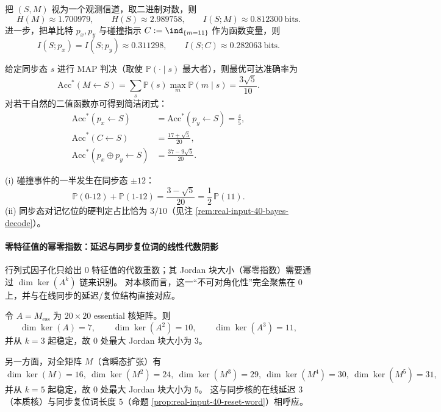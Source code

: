 \begin{remark}\label{rem:real-input-40-mutual-info}
把 $(S,M)$ 视为一个观测信道，取二进制对数，则
\[
H(M)\approx 1.700979,\qquad
H(S)\approx 2.989758,\qquad
I(S;M)\approx 0.812300\ \text{bits}.
\]
进一步，把单比特 $p_x,p_y$ 与碰撞指示 $C:=\ind_{\{m=11\}}$ 作为函数变量，则
\[
I(S;p_x)=I(S;p_y)\approx 0.311298,\qquad
I(S;C)\approx 0.282063\ \text{bits}.
\]
\end{remark}

\begin{proposition}\label{prop:real-input-40-map-accuracies}
给定同步态 $s$ 进行 MAP 判决（取使 $\mathbb{P}(\cdot\mid s)$ 最大者），则最优可达准确率为
\[
\mathrm{Acc}^*(M\leftarrow S)=\sum_s \mathbb{P}(s)\max_m \mathbb{P}(m\mid s)=\frac{3\sqrt5}{10}.
\]
对若干自然的二值函数亦可得到简洁闭式：
\[
\begin{aligned}
\mathrm{Acc}^*(p_x\leftarrow S)&=\mathrm{Acc}^*(p_y\leftarrow S)=\frac45,\\
\mathrm{Acc}^*(C\leftarrow S)&=\frac{17+\sqrt5}{20},\\
\mathrm{Acc}^*(p_x\oplus p_y\leftarrow S)&=\frac{37-9\sqrt5}{20}.
\end{aligned}
\]
\end{proposition}

\begin{remark}\label{rem:real-input-40-two-dyn-inferences}
(i) 碰撞事件的一半发生在同步态 $\pm12$：
\[
\mathbb{P}(0\text{-}12)+\mathbb{P}(1\text{-}12)=\frac{3-\sqrt5}{20}=\frac12\,\mathbb{P}(11).
\]
(ii) 同步态对记忆位的硬判定占比恰为 $3/10$（见注 \ref{rem:real-input-40-bayes-decode}）。
\end{remark}

\paragraph{零特征值的幂零指数：延迟与同步复位词的线性代数阴影}
行列式因子化只给出 $0$ 特征值的代数重数；其 Jordan 块大小（幂零指数）需要通过 $\dim\ker(A^k)$ 链来识别。
对本核而言，这一“不可对角化性”完全聚焦在 $0$ 上，并与在线同步的延迟/复位结构直接对应。

\begin{proposition}\label{prop:real-input-40-nilpotent-index}
令 $A=M_{\mathrm{ess}}$ 为 $20\times 20$ essential 核矩阵。则
\[
\dim\ker(A)=7,\qquad
\dim\ker(A^2)=10,\qquad
\dim\ker(A^3)=11,
\]
并从 $k=3$ 起稳定，故 $0$ 处最大 Jordan 块大小为 $3$。

另一方面，对全矩阵 $M$（含瞬态扩张）有
\[
\dim\ker(M)=16,\ 
\dim\ker(M^2)=24,\ 
\dim\ker(M^3)=29,\ 
\dim\ker(M^4)=30,\ 
\dim\ker(M^5)=31,
\]
并从 $k=5$ 起稳定，故 $0$ 处最大 Jordan 块大小为 $5$。
这与同步核的在线延迟 $3$（本质核）与同步复位词长度 $5$（命题 \ref{prop:real-input-40-reset-word}）相呼应。
\end{proposition}


